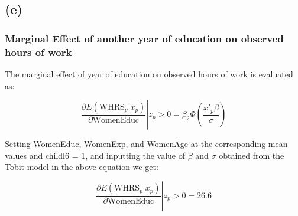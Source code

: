 \documentclass[a4paper]{article}
\begin{document}
\subsection*{(e)}
\subsubsection*{Marginal Effect of another year of education on observed hours of work}

The marginal effect of year of education on observed hours of work is evaluated as:

\[
    \left. \frac{\partial E(\text{WHRS}_p|x_p)}{\partial \text{WomenEduc}} \right| z_p > 0 = \beta_{2} \Phi (\frac{\bar{x}'_p \beta}{\sigma})
\]

Setting WomenEduc, WomenExp, and WomenAge at the corresponding mean values and childl6 = 1, and inputting the value of $\beta$ and $\sigma$ obtained from the Tobit model in the above equation we get:

\[
    \left. \frac{\partial E(\text{WHRS}_p|x_p)}{\partial \text{WomenEduc}} \right| z_p > 0 = 26.6
\]
\end{document}
